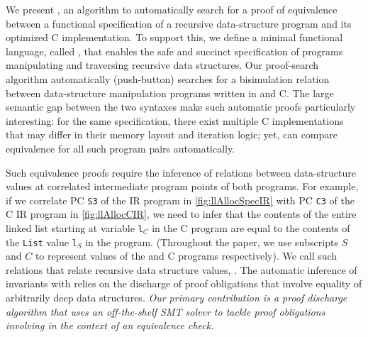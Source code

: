 We present \toolName{}, an algorithm to automatically
search for a proof of equivalence between a functional specification
of a recursive data-structure program
and its
optimized C implementation.
To support
this, we define a minimal functional language, called \SpecL{}, that enables the
safe and succinct specification
of programs manipulating and traversing recursive data structures.
Our proof-search algorithm automatically (push-button)
searches for a bisimulation relation
between data-structure manipulation programs
written in \SpecL{} and C.
The large semantic gap between
the two syntaxes make such automatic
proofs particularly interesting: for the same \SpecL{} specification,
there exist multiple
C implementations that may differ in their memory layout and
iteration logic; yet, \toolName{} can compare equivalence for all such
program pairs automatically.



Such equivalence proofs require the
inference of relations between data-structure values
at correlated intermediate program points of both programs.
For example, if we correlate PC {\tt S3} of the \SpecL{}
IR program in \cref{fig:llAllocSpecIR}
with PC {\tt C3} of the C IR program in \cref{fig:llAllocCIR}, we
need to infer
that the contents of the entire linked list starting at
variable {\tt l$_C$} in the C program are equal to
the contents of the {\tt List} value {\tt l$_S$} in the \SpecL{} program.
(Throughout the paper, we use subscripts $S$ and $C$ to represent values
of the \SpecL{} and C programs respectively).
We call such relations that relate
recursive data structure values, {\em \recursiveRelations{}}.
The automatic
inference of invariants
with \recursiveRelations{}
relies on the discharge of proof obligations
that involve equality of arbitrarily deep
data structures.
{\em Our primary contribution is a
proof discharge algorithm that
uses an off-the-shelf SMT
solver to tackle proof obligations involving \recursiveRelations{}
in the context of an equivalence check}.

